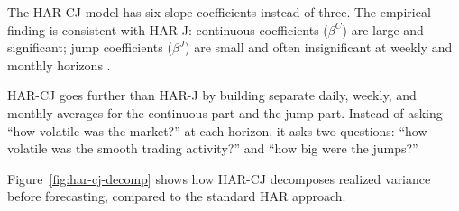 The HAR-CJ model has six slope coefficients instead of three.
The empirical finding is consistent with HAR-J: continuous coefficients ($\beta^C$) are large and significant; jump coefficients ($\beta^J$) are small and often insignificant at weekly and monthly horizons \citep{CorsiPirinoReno2010}.

\begin{intuition}
HAR-CJ goes further than HAR-J by building separate daily, weekly, and monthly averages for the continuous part and the jump part.
Instead of asking ``how volatile was the market?'' at each horizon, it asks two questions: ``how volatile was the smooth trading activity?'' and ``how big were the jumps?''
\end{intuition}

Figure~\ref{fig:har-cj-decomp} shows how HAR-CJ decomposes realized variance before forecasting, compared to the standard HAR approach.

